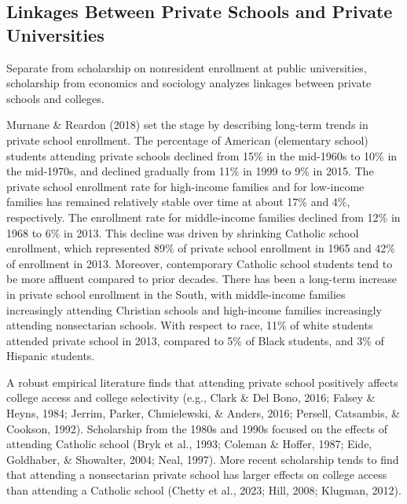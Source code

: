 \documentclass[
  12pt,
]{article}
\begin{document}
\hypertarget{linkages-between-private-schools-and-private-universities}{%
\subsection{Linkages Between Private Schools and Private Universities}\label{linkages-between-private-schools-and-private-universities}}

Separate from scholarship on nonresident enrollment at public universities, scholarship from economics and sociology analyzes linkages between private schools and colleges.

Murnane \& Reardon (2018) set the stage by describing long-term trends in private school enrollment. The percentage of American (elementary school) students attending private schools declined from 15\% in the mid-1960s to 10\% in the mid-1970s, and declined gradually from 11\% in 1999 to 9\% in 2015. The private school enrollment rate for high-income families and for low-income families has remained relatively stable over time at about 17\% and 4\%, respectively. The enrollment rate for middle-income families declined from 12\% in 1968 to 6\% in 2013. This decline was driven by shrinking Catholic school enrollment, which represented 89\% of private school enrollment in 1965 and 42\% of enrollment in 2013. Moreover, contemporary Catholic school students tend to be more affluent compared to prior decades. There has been a long-term increase in private school enrollment in the South, with middle-income families increasingly attending Christian schools and high-income families increasingly attending nonsectarian schools. With respect to race, 11\% of white students attended private school in 2013, compared to 5\% of Black students, and 3\% of Hispanic students.

A robust empirical literature finds that attending private school positively affects college access and college selectivity (e.g., Clark \& Del Bono, 2016; Falsey \& Heyns, 1984; Jerrim, Parker, Chmielewski, \& Anders, 2016; Persell, Catsambis, \& Cookson, 1992). Scholarship from the 1980s and 1990s focused on the effects of attending Catholic school (Bryk et al., 1993; Coleman \& Hoffer, 1987; Eide, Goldhaber, \& Showalter, 2004; Neal, 1997). More recent scholarship tends to find that attending a nonsectarian private school has larger effects on college access than attending a Catholic school (Chetty et al., 2023; Hill, 2008; Klugman, 2012).
\end{document}
